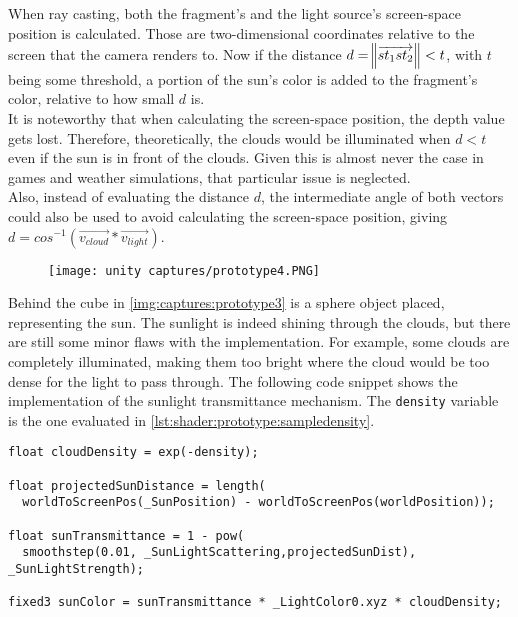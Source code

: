 \noindent
When ray casting, both the fragment's and the light source's screen-space position is calculated. Those are two-dimensional coordinates relative to the screen that the camera renders to.
Now if the distance $d = \norm{\overrightarrow{st_1 st_2}} < t$, with $t$ being some threshold, a portion of the sun's color is added to the fragment's color, relative to how small $d$ is.
\\
It is noteworthy that when calculating the screen-space position, the depth value gets lost. Therefore, theoretically, the clouds would be illuminated when $d < t$ even if the sun is in front of the clouds.
Given this is almost never the case in games and weather simulations, that particular issue is neglected.
\\
Also, instead of evaluating the distance $d$, the intermediate angle of both vectors could also be used to avoid calculating the screen-space position, giving $d = cos^{-1}\left(\overrightarrow{v_{cloud}} * \overrightarrow{v_{light}}\right)$.

\begin{figure}[H]
    \centering
    \texttt{[image: unity captures/prototype4.PNG]}
    \label{img:captures:prototype3}
\end{figure}

\noindent
Behind the cube in \autoref{img:captures:prototype3} is a sphere object placed, representing the sun. The sunlight is indeed shining through the clouds, but there are still some minor flaws with the implementation.
For example, some clouds are completely illuminated, making them too bright where the cloud would be too dense for the light to pass through.
\emptyline
The following code snippet shows the implementation of the sunlight transmittance mechanism. The \lstinline[language=HLSL]{density} variable is the one evaluated in \autoref{lst:shader:prototype:sampledensity}.

\begin{lstlisting}[language=HLSL, caption=Implementation of a sunlight transmittance mechanism., label=lst:shader:prototype:sunlighttransmittance]
float cloudDensity = exp(-density);

float projectedSunDistance = length(
  worldToScreenPos(_SunPosition) - worldToScreenPos(worldPosition));

float sunTransmittance = 1 - pow(
  smoothstep(0.01, _SunLightScattering,projectedSunDist), _SunLightStrength);

fixed3 sunColor = sunTransmittance * _LightColor0.xyz * cloudDensity;
\end{lstlisting}

